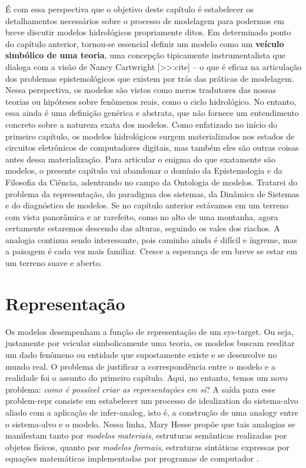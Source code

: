 \documentclass[./main.tex]{subfiles}
\begin{document}
\par É com essa perspectiva que o objetivo deste capítulo é estabelecer os detalhamentos necessários sobre o processo de modelagem para podermos em breve discutir modelos hidrológicos propriamente ditos. Em determinado ponto do capítulo anterior, tornou-se essencial definir um modelo como um \textbf{veículo simbólico de uma teoria}, uma concepção tipicamente instrumentalista que dialoga com a visão de Nancy Cartwright [>>:cite] -- o que é eficaz na articulação dos problemas epistemológicos que existem por trás das práticas de modelagem. Nessa perspectiva, os modelos são vistos como meros tradutores das nossas teorias ou hipóteses sobre fenômenos reais, como o ciclo hidrológico. No entanto, essa ainda é uma definição genérica e abstrata, que não fornece um entendimento concreto sobre a natureza exata dos modelos. Como enfatizado no início do primeiro capítulo, os modelos hidrológicos surgem materializados nos estados de circuitos eletrônicos de computadores digitais, mas também eles são outras coisas antes dessa materialização. Para articular o enigma do que exatamente são modelos, o presente capítulo vai abandonar o domínio da Epistemologia e da Filosofia da Ciência, adentrando no campo da Ontologia de modelos. Tratarei do problema da representação, do paradigma dos sistemas, da Dinâmica de Sistemas e do diagnóstico de modelos. Se no capítulo anterior estávamos em um terreno com vista panorâmica e ar rarefeito, como no alto de uma montanha, agora certamente estaremos descendo das alturas, seguindo os vales dos riachos. A analogia continua sendo interessante, pois caminho ainda é difícil e íngreme, mas a paisagem é cada vez mais familiar. Cresce a esperança de em breve se estar em um terreno suave e aberto.

\section{Representação} \label{sec:sys:represent}

\par Os modelos desempenham a função de representação de um \gls{sys-target}. Ou seja, justamente por veicular simbolicamente uma teoria, os modelos buscam reeditar um dado fenômeno ou entidade que supostamente existe e se desenvolve no mundo real. O problema de justificar a correspondência entre o modelo e a realidade foi o assunto do primeiro capítulo. Aqui, no entanto, temos um novo problema: \textit{como é possível criar as representações em si}? A saída para esse \gls{problem-repr} consiste em estabelecer um processo de \gls{idealization} do sistema-alvo aliado com a aplicação de \gls{infer-analog}, isto é, a construção de uma \gls{analogy} entre o sistema-alvo e o modelo. Nessa linha, Mary Hesse propõe que tais analogias se manifestam tanto por \textit{modelos materiais}, estruturas semânticas realizadas por objetos físicos, quanto por \textit{modelos formais}, estruturas sintáticas expressas por equações matemáticas implementadas por programas de computador \cite{hesse2017}.
\end{document}
